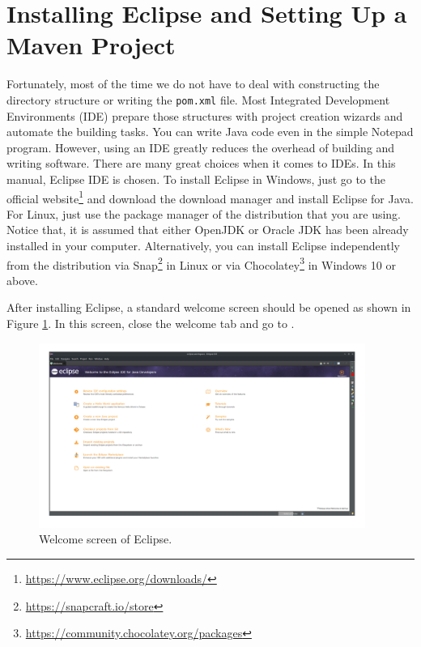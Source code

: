 \section{Installing Eclipse and Setting Up a Maven Project}
Fortunately, most of the time we do not have to deal with constructing the directory structure or writing the \lstinline[language={}]|pom.xml| file. Most Integrated Development Environments (IDE) prepare those structures with project creation wizards and automate the building tasks. You can write Java code even in the simple Notepad program. However, using an IDE greatly reduces the overhead of building and writing software. There are many great choices when it comes to IDEs. In this manual, Eclipse IDE is chosen. To install Eclipse in Windows, just go to the official website\footnote{\url{https://www.eclipse.org/downloads/}} and download the download manager and install Eclipse for Java. For Linux, just use the package manager of the distribution that you are using. Notice that, it is assumed that either OpenJDK or Oracle JDK has been already installed in your computer. Alternatively, you can install Eclipse independently from the distribution via Snap\footnote{\url{https://snapcraft.io/store}} in Linux or via Chocolatey\footnote{\url{https://community.chocolatey.org/packages}} in Windows 10 or above.

After installing Eclipse, a standard welcome screen should be opened as shown in Figure \ref{fig:eclipse-welcome}. In this screen, close the welcome tab and go to .

\begin{figure}[H]
    \centering
    \includegraphics[width=0.95\textwidth]{images/eclipse-welcome.png}
    \caption{Welcome screen of Eclipse.}
    \label{fig:eclipse-welcome}
\end{figure}

